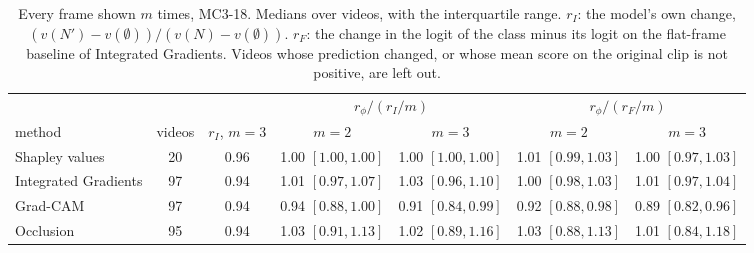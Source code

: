 \begin{table}[h]
\centering
\caption{Every frame shown $m$ times, MC3-18. Medians over videos, with the interquartile range. $r_I$: the model's own change, $(v(N') - v(\emptyset)) / (v(N) - v(\emptyset))$. $r_F$: the change in the logit of the class minus its logit on the flat-frame baseline of Integrated Gradients. Videos whose prediction changed, or whose mean score on the original clip is not positive, are left out.}
\label{tab:whole-repeat}
\small
\setlength{\tabcolsep}{4pt}
\begin{tabular}{lcccccc}
\toprule
 & & & \multicolumn{2}{c}{$r_\phi / (r_I / m)$} & \multicolumn{2}{c}{$r_\phi / (r_F / m)$} \\
\cmidrule(lr){4-5} \cmidrule(lr){6-7}
method & videos & $r_I$, $m = 3$ & $m = 2$ & $m = 3$ & $m = 2$ & $m = 3$ \\
\midrule
Shapley values        & 20 & 0.96 & 1.00 $[1.00, 1.00]$ & 1.00 $[1.00, 1.00]$ & 1.01 $[0.99, 1.03]$ & 1.00 $[0.97, 1.03]$ \\
Integrated Gradients  & 97 & 0.94 & 1.01 $[0.97, 1.07]$ & 1.03 $[0.96, 1.10]$ & 1.00 $[0.98, 1.03]$ & 1.01 $[0.97, 1.04]$ \\
Grad-CAM              & 97 & 0.94 & 0.94 $[0.88, 1.00]$ & 0.91 $[0.84, 0.99]$ & 0.92 $[0.88, 0.98]$ & 0.89 $[0.82, 0.96]$ \\
Occlusion             & 95 & 0.94 & 1.03 $[0.91, 1.13]$ & 1.02 $[0.89, 1.16]$ & 1.03 $[0.88, 1.13]$ & 1.01 $[0.84, 1.18]$ \\
\bottomrule
\end{tabular}
\end{table}

